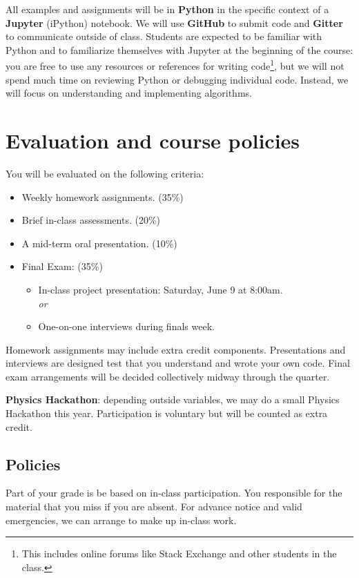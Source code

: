 \documentclass[12pt]{article}
\numberwithin{equation}{section}    %
\begin{document}
All examples and assignments will be in \textbf{Python} in the specific context of a \textbf{Jupyter} (iPython) notebook. We will use \textbf{GitHub} to submit code and \textbf{Gitter} to communicate outside of class.
%
Students are expected to be familiar with Python and to familiarize themselves with Jupyter at the beginning of the course: you are free to use any resources or references for writing code\footnote{This includes online forums like Stack Exchange and other students in the class.}, but we will not spend much time on reviewing Python or debugging individual code. Instead, we will focus on understanding and implementing algorithms.


\section*{Evaluation and course policies}

You will be evaluated on the following criteria:
\begin{itemize}
	\item Weekly homework assignments. (35\%)
	\item Brief in-class assessments. (20\%)
	\item A mid-term oral presentation. (10\%)
	\item Final Exam: (35\%) \begin{itemize}
		\item 	In-class project presentation: Saturday, June 9 at 8:00am. 
			\\ \emph{or}
		\item  One-on-one interviews during finals week.
			\end{itemize}
\end{itemize}
Homework assignments may include extra credit components. Presentations and interviews are designed test that you understand and wrote your own code. Final exam arrangements will be decided collectively midway through the quarter. 

\vspace{1em}
\noindent\textbf{Physics Hackathon}: depending outside variables, we may do a small Physics Hackathon this year. Participation is voluntary but will be counted as extra credit.


\subsection*{Policies}

Part of your grade is be based on in-class participation. You responsible for the material that you miss if you are absent. For advance notice and valid emergencies, we can arrange to make up in-class work. 
\end{document}
